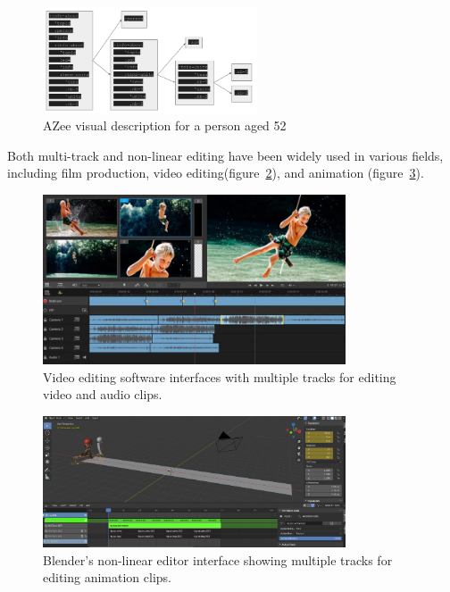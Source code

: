 \documentclass[../../main.tex]{subfiles}
\begin{document}
\begin{figure}[h]
  \centering \includegraphics[width = 2.5in]{chapters/background_work/images/azee_score_example.png}
  \caption{AZee visual description for a person aged 52}
  \label{fig:azee_score_example}
\end{figure}

Both multi-track and non-linear editing have been widely used in various fields, including film production, video editing(figure~\ref{fig:video_edit}), and animation (figure~\ref{fig:nle_blender}). 

\begin{figure}[h]
    \centering
    \includegraphics[width=0.8\textwidth]{chapters/multi_track/images/video_editing.png}
    \caption{Video editing software interfaces with multiple tracks for editing video and audio clips.}
    \label{fig:video_edit}
\end{figure}

\begin{figure}[h]
    \centering
    \includegraphics[width=0.8\textwidth]{chapters/multi_track/images/nle_blender.png}
    \caption{Blender's non-linear editor interface showing multiple tracks for editing animation clips.}
    \label{fig:nle_blender}
\end{figure}
\end{document}
